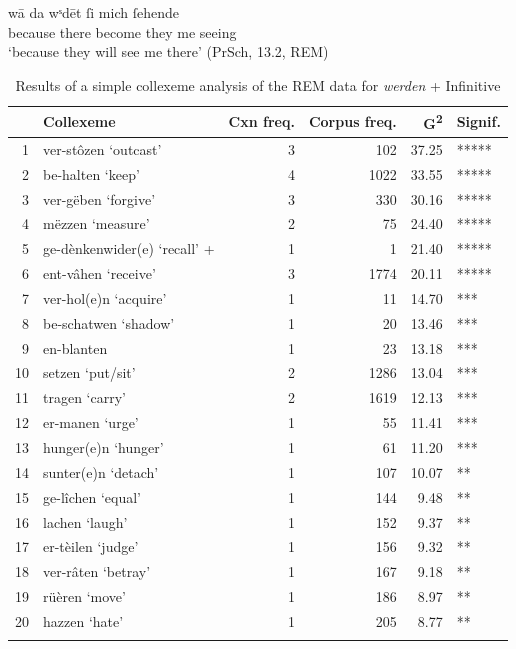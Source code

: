 \documentclass[output=paper,colorlinks,citecolor=brown]{langscibook}
\begin{document}
\ea \label{ex:hs:sehende}
\gll wā da wˢdēt ſi mich ſehende \\
because there become they me seeing \\
\glt `because they will see me there' (PrSch, 13.2, REM)
\z



\begin{table}[ht]
\centering
\begin{tabular}{rlrrrl}
  \lsptoprule
 & Collexeme & Cxn freq. & Corpus freq. & G\textsuperscript{2} & Signif. \\ 
  \midrule
1 & ver-stôzen `outcast'&   3 & 102 & 37.25 & ***** \\ 
  2 & be-halten `keep'&   4 & 1022 & 33.55 & ***** \\ 
  3 & ver-gëben `forgive'&   3 & 330 & 30.16 & ***** \\ 
  4 & mëzzen `measure'&   2 &  75 & 24.40 & ***** \\ 
  5 & ge-dènkenwider(e) `recall' + &   1 &   1 & 21.40 & ***** \\ 
  6 & ent-vâhen `receive'&   3 & 1774 & 20.11 & ***** \\ 
  7 & ver-hol(e)n `acquire'&   1 &  11 & 14.70 & *** \\ 
  8 & be-schatwen `shadow' &   1 &  20 & 13.46 & *** \\ 
  9 & en-blanten &   1 &  23 & 13.18 & *** \\ 
  10 & setzen `put/sit' &   2 & 1286 & 13.04 & *** \\ 
  11 & tragen `carry' &   2 & 1619 & 12.13 & *** \\ 
  12 & er-manen `urge' &   1 &  55 & 11.41 & *** \\ 
  13 & hunger(e)n `hunger'&   1 &  61 & 11.20 & *** \\ 
  14 & sunter(e)n `detach'&   1 & 107 & 10.07 & ** \\ 
  15 & ge-lîchen `equal'&   1 & 144 & 9.48 & ** \\ 
  16 & lachen `laugh' &   1 & 152 & 9.37 & ** \\ 
  17 & er-tèilen `judge'&   1 & 156 & 9.32 & ** \\ 
  18 & ver-râten `betray'&   1 & 167 & 9.18 & ** \\ 
  19 & rüèren `move'&   1 & 186 & 8.97 & ** \\ 
  20 & hazzen `hate'&   1 & 205 & 8.77 & ** \\ 
   \lspbottomrule
\end{tabular}
\caption{Results of a simple collexeme analysis of the REM data for \textit{werden} + Infinitive} 
\label{simple_collex_werden_inf_rem}
\end{table}
\end{document}
